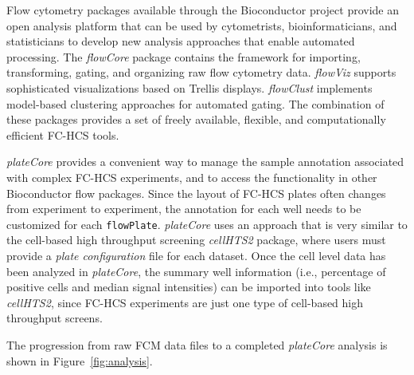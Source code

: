 \documentclass[12pt]{article}
\newcommand{\Rclass}[1]{{\texttt{#1}}}
\newcommand{\Rpackage}[1]{{\textit{#1}}}
\begin{document}
Flow cytometry packages available through the Bioconductor project provide an open analysis platform that
can be used by cytometrists, bioinformaticians, and statisticians to develop new analysis approaches that
enable automated processing. The \Rpackage{flowCore} package contains the framework for importing, transforming, gating, and
organizing raw flow cytometry data. \Rpackage{flowViz} supports sophisticated visualizations based on Trellis displays. 
\Rpackage{flowClust} implements model-based clustering approaches for automated gating. The combination of
these packages provides a set of freely available, flexible, and computationally efficient FC-HCS tools.

\Rpackage{plateCore} provides a convenient way to manage the sample annotation associated with complex FC-HCS experiments, and
to access the functionality in other Bioconductor flow packages. Since the layout of FC-HCS plates often changes from experiment
to experiment, the annotation for each well needs to be customized for each \Rclass{flowPlate}. \Rpackage{plateCore}
uses an approach that is very similar to the cell-based high throughput screening \Rpackage{cellHTS2} package,
where users must provide a \textit{plate configuration} file for each dataset. Once the cell level data has
been analyzed in \Rpackage{plateCore}, the summary well information (i.e., percentage of positive cells and median
signal intensities) can be imported into tools like \Rpackage{cellHTS2}, since FC-HCS experiments are just one 
type of cell-based high throughput screens.

The progression from raw FCM data files to a completed \Rpackage{plateCore} analysis is shown in Figure~\ref{fig:analysis}.
\end{document}
